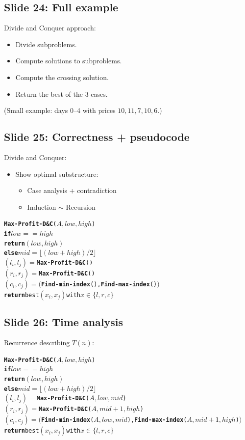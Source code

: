 \documentclass[11pt]{article}
\newcommand{\slide}[2]{\subsection*{Slide #1: #2}}
\begin{document}
\slide{24}{Full example}
Divide and Conquer approach:
\begin{itemize}
  \item Divide subproblems.
  \item Compute solutions to subproblems.
  \item Compute the crossing solution.
  \item Return the best of the 3 cases.
\end{itemize}
(Small example: days 0--4 with prices $10, 11, 7, 10, 6$.)

\slide{25}{Correctness + pseudocode}
Divide and Conquer:
\begin{itemize}
  \item Show optimal substructure:
  \begin{itemize}
    \item Case analysis + contradiction
    \item Induction $\sim$ Recursion
  \end{itemize}
\end{itemize}

\begin{alltt}
\textbf{Max-Profit-D\&C}(\(A, low, high\))
    \textbf{if} \(low == high\)
        \textbf{return} \((low, high)\)
    \textbf{else} \(mid = \lfloor (low + high)/2 \rfloor\)
        \((l_i, l_j) =\) \textbf{Max-Profit-D\&C}(\underline{\hspace{1.5cm}})
        \((r_i, r_j) =\) \textbf{Max-Profit-D\&C}(\underline{\hspace{1.5cm}})
        \((c_i, c_j) = (\) \textbf{Find-min-index}(\underline{\hspace{1.2cm}}), \textbf{Find-max-index}(\underline{\hspace{1.2cm}})\()\)
    \textbf{return} best \((x_i, x_j)\) with \(x \in \{l, r, c\}\)
\end{alltt}

\slide{26}{Time analysis}
Recurrence describing $T(n)$:

\begin{alltt}
\textbf{Max-Profit-D\&C}(\(A, low, high\))
    \textbf{if} \(low == high\)
        \textbf{return} \((low, high)\)
    \textbf{else} \(mid = \lfloor (low + high)/2 \rfloor\)
        \((l_i, l_j) =\) \textbf{Max-Profit-D\&C}(\(A, low, mid\))
        \((r_i, r_j) =\) \textbf{Max-Profit-D\&C}(\(A, mid+1, high\))
        \((c_i, c_j) = (\) \textbf{Find-min-index}(\(A, low, mid\)), \textbf{Find-max-index}(\(A, mid+1, high\))\()\)
    \textbf{return} best \((x_i, x_j)\) with \(x \in \{l, r, c\}\)
\end{alltt}
\end{document}
